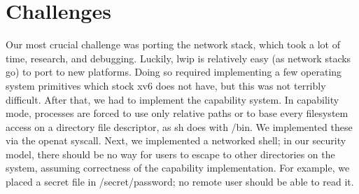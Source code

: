 \documentclass[12pt]{article}
\begin{document}
\section{Challenges}
Our most crucial challenge was porting the network stack, which took a lot of time, research, and debugging. Luckily, lwip is relatively easy (as network stacks go) to port to new platforms. Doing so required implementing a few operating system primitives which stock xv6 does not have, but this was not terribly difficult. After that, we had to implement the capability system. In capability mode, processes are forced to use only relative paths or to base every filesystem access on a directory file descriptor, as sh does with /bin. We implemented these via the openat syscall. Next, we implemented a networked shell; in our security model, there should be no way for users to escape to other directories on the system, assuming correctness of the capability implementation. For example, we placed a secret file in /secret/password; no remote user should be able to read it. 
\end{document}
